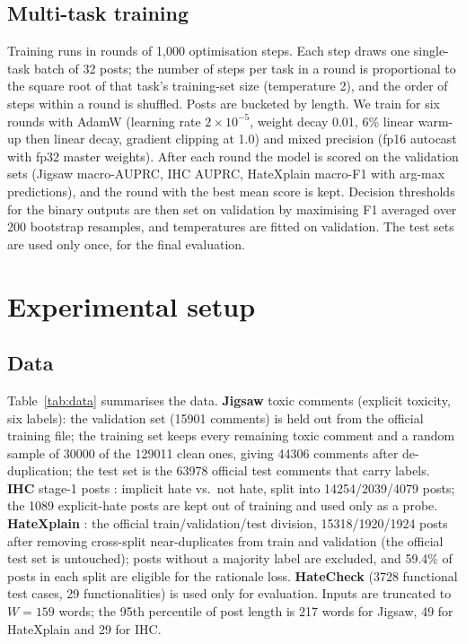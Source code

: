 \documentclass[preprint,12pt,authoryear]{elsarticle}
\begin{document}
\subsection{Multi-task training}
Training runs in rounds of 1{,}000 optimisation steps. Each step draws one single-task batch of 32 posts; the number of steps per task in a round is proportional to the square root of that task's training-set size (temperature 2), and the order of steps within a round is shuffled. Posts are bucketed by length. We train for six rounds with AdamW (learning rate $2\times10^{-5}$, weight decay 0.01, 6\% linear warm-up then linear decay, gradient clipping at 1.0) and mixed precision (fp16 autocast with fp32 master weights). After each round the model is scored on the validation sets (Jigsaw macro-AUPRC, IHC AUPRC, HateXplain macro-F1 with arg-max predictions), and the round with the best mean score is kept. Decision thresholds for the binary outputs are then set on validation by maximising F1 averaged over 200 bootstrap resamples, and temperatures are fitted on validation. The test sets are used only once, for the final evaluation.

\section{Experimental setup}
\label{sec:setup}

\subsection{Data}
Table~\ref{tab:data} summarises the data. \textbf{Jigsaw} toxic comments \citep{jigsaw2018toxic} (explicit toxicity, six labels): the validation set (\num{15901} comments) is held out from the official training file; the training set keeps every remaining toxic comment and a random sample of \num{30000} of the \num{129011} clean ones, giving \num{44306} comments after de-duplication; the test set is the \num{63978} official test comments that carry labels. \textbf{IHC} stage-1 posts \citep{elsherief2021latent}: implicit hate vs.\ not hate, split into \num{14254}/\num{2039}/\num{4079} posts; the \num{1089} explicit-hate posts are kept out of training and used only as a probe. \textbf{HateXplain} \citep{mathew2021hatexplain}: the official train/validation/test division, \num{15318}/\num{1920}/\num{1924} posts after removing cross-split near-duplicates from train and validation (the official test set is untouched); posts without a majority label are excluded, and 59.4\% of posts in each split are eligible for the rationale loss. \textbf{HateCheck} \citep{rottger2021hatecheck} (\num{3728} functional test cases, 29 functionalities) is used only for evaluation. Inputs are truncated to $W=159$ words; the 95th percentile of post length is 217 words for Jigsaw, 49 for HateXplain and 29 for IHC.
\end{document}
